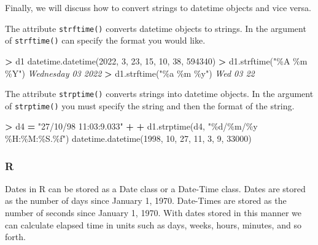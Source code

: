 \documentclass[
]{book}
\newenvironment{Shaded}{\begin{snugshade}}{\end{snugshade}}
\newcommand{\CommentTok}[1]{\textcolor[rgb]{0.56,0.35,0.01}{\textit{#1}}}
\newcommand{\DecValTok}[1]{\textcolor[rgb]{0.00,0.00,0.81}{#1}}
\newcommand{\NormalTok}[1]{#1}
\newcommand{\OperatorTok}[1]{\textcolor[rgb]{0.81,0.36,0.00}{\textbf{#1}}}
\newcommand{\SpecialCharTok}[1]{\textcolor[rgb]{0.00,0.00,0.00}{#1}}
\newcommand{\StringTok}[1]{\textcolor[rgb]{0.31,0.60,0.02}{#1}}
\begin{document}
Finally, we will discuss how to convert strings to datetime objects and vice versa.

The attribute \texttt{strftime()} converts datetime objects to strings. In the argument of \texttt{strftime()} can specify the format you would like.

\begin{Shaded}
\begin{Highlighting}[]
\OperatorTok{\textgreater{}}\NormalTok{ d1}
\NormalTok{datetime.datetime(}\DecValTok{2022}\NormalTok{, }\DecValTok{3}\NormalTok{, }\DecValTok{23}\NormalTok{, }\DecValTok{15}\NormalTok{, }\DecValTok{10}\NormalTok{, }\DecValTok{38}\NormalTok{, }\DecValTok{594340}\NormalTok{)}
\OperatorTok{\textgreater{}}\NormalTok{ d1.strftime(}\StringTok{"\%A \%m \%Y"}\NormalTok{)}
\CommentTok{\textquotesingle{}Wednesday 03 2022\textquotesingle{}}
\OperatorTok{\textgreater{}}\NormalTok{ d1.strftime(}\StringTok{"\%a \%m \%y"}\NormalTok{)}
\CommentTok{\textquotesingle{}Wed 03 22\textquotesingle{}}
\end{Highlighting}
\end{Shaded}

The attribute \texttt{strptime()} converts strings into datetime objects. In the argument of \texttt{strptime()} you must specify the string and then the format of the string.

\begin{Shaded}
\begin{Highlighting}[]
\OperatorTok{\textgreater{}}\NormalTok{ d4 }\OperatorTok{=} \StringTok{"27/10/98 11:03:9.033"}
\OperatorTok{+} 
\OperatorTok{+}\NormalTok{ d1.strptime(d4, }\StringTok{"}\SpecialCharTok{\%d}\StringTok{/\%m/\%y \%H:\%M:\%S.}\SpecialCharTok{\%f}\StringTok{"}\NormalTok{)}
\NormalTok{datetime.datetime(}\DecValTok{1998}\NormalTok{, }\DecValTok{10}\NormalTok{, }\DecValTok{27}\NormalTok{, }\DecValTok{11}\NormalTok{, }\DecValTok{3}\NormalTok{, }\DecValTok{9}\NormalTok{, }\DecValTok{33000}\NormalTok{)}
\end{Highlighting}
\end{Shaded}

\hypertarget{r-28}{%
\subsubsection*{R}\label{r-28}}

Dates in R can be stored as a Date class or a Date-Time class. Dates are stored as the number of days since January 1, 1970. Date-Times are stored as the number of seconds since January 1, 1970. With dates stored in this manner we can calculate elapsed time in units such as days, weeks, hours, minutes, and so forth.
\end{document}
